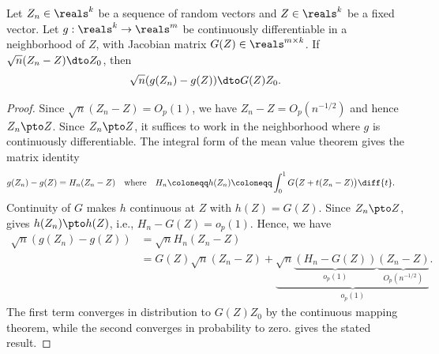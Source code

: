 \documentclass[a4paper,12pt]{article}
\begin{document}
\begin{theorem}\label{thm-delta-method}
	Let $Z_n\in\reals^k$ be a sequence of random vectors and $Z\in\reals^k$ be a fixed vector.
	Let $g:\reals^k\to\reals^m$ be continuously differentiable in a neighborhood of $Z$, with Jacobian matrix $G(Z)\in\reals^{m\times k}$.
	If $\sqrt{n}(Z_n-Z)\dto Z_0$, then
	\begin{align}
		\sqrt{n}(g(Z_n)-g(Z))\dto G(Z)Z_0.
	\end{align}
\end{theorem}
\begin{proof}
	Since $\sqrt{n}(Z_n-Z)=O_p(1)$, we have $Z_n-Z=O_p(n^{-1/2})$ and hence $Z_n\pto Z$.
	Since $Z_n\pto Z$, it suffices to work in the neighborhood where $g$ is continuously differentiable.
	The integral form of the mean value theorem gives the matrix identity
	\begin{align*}
		g(Z_n)-g(Z)=H_n(Z_n-Z)
		&\quad\text{where}\quad
		H_n\coloneqq h(Z_n)\coloneqq \int_0^1G\big(Z+t(Z_n-Z)\big)\diff{t}.
	\end{align*}
	Continuity of $G$ makes $h$ continuous at $Z$ with $h(Z)=G(Z)$.
	Since $Z_n\pto Z$,  gives $h(Z_n)\pto h(Z)$, i.e., $H_n-G(Z)=o_p(1)$.
	Hence, we have
	\begin{align*}
		\sqrt{n}(g(Z_n)-g(Z))
		&= \sqrt{n} H_n(Z_n-Z) \\
		&= G(Z)\sqrt{n}(Z_n-Z) + \underbrace{\sqrt{n} \underbrace{(H_n-G(Z))}_{o_p(1)} \underbrace{(Z_n-Z)}_{O_p(n^{-1/2})}}_{o_p(1)}.
	\end{align*}
	The first term converges in distribution to $G(Z)Z_0$ by the continuous mapping theorem,
	while the second converges in probability to zero.
	 gives the stated result.
\end{proof}
\end{document}
